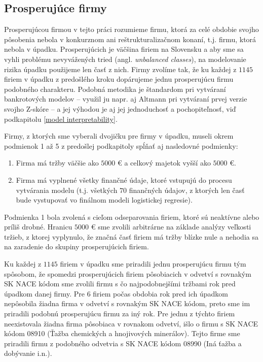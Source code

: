 \subsection{Prosperujúce firmy}

Prosperujúcou firmou v tejto práci rozumieme firmu, ktorá za celé obdobie svojho pôsobenia nebola v konkurznom ani reštrukturalizačnom konaní, t.j. firmu, ktorá nebola v úpadku.
Prosperujúcich je väčšina firiem na Slovensku a aby sme sa vyhli problému nevyvážených tried (angl. \emph{unbalanced classes}),
na modelovanie rizika úpadku použijeme len časť z nich.
Firmy zvolíme tak, že ku každej z \(1145\) firiem v úpadku z predošlého kroku dopárujeme jednu prosperujúcu firmu podobného charakteru.
Podobná metodika je štandardom pri vytváraní bankrotových modelov – využil ju napr. aj Altmann pri vytváraní prvej verzie svojho Z-skóre – a jej výhodou je aj jej jednoduchosť a pochopiteľnosť, viď podkapitolu \ref{model interpretability}.

Firmy, z ktorých sme vyberali dvojičku pre firmy v úpadku, museli okrem podmienok 1 až 5 z predošlej podkapitoly spĺňať aj nasledovné podmienky:

\begin{enumerate}
    \item Firma má tržby väčšie ako \(5000\) € a celkový majetok vyšší ako \(5000\) €.
    \item Firma má vyplnené všetky finančné údaje, ktoré vstupujú do procesu vytvárania modelu (t.j. všetkých \(70\) finančných údajov, z ktorých len časť bude vystupovať vo finálnom modeli logistickej regresie).
\end{enumerate}

Podmienka 1 bola zvolená s cieľom odseparovania firiem, ktoré sú neaktívne alebo príliš drobné.
Hranicu \(5000\) € sme zvolili arbitrárne na základe analýzy veľkosti tržieb, z ktorej vyplynulo, že značná časť firiem má tržby blízke nule a nehodia sa na zaradenie do skupiny prosperujúcich firiem.

Ku každej z \(1145\) firiem v úpadku sme priradili jednu prosperujúcu firmu tým spôsobom,
že spomedzi prosperujúcich firiem pôsobiacich v odvetví s rovnakým SK NACE kódom sme zvolili firmu s čo najpodobnejšími tržbami rok pred úpadkom danej firmy.
Pre \(6\) firiem počas obdobia rok pred ich úpadkom nepôsobila žiadna firma v odvetví s rovnakým SK NACE kódom, preto sme im priradili podobnú prosperujúcu firmu za iný rok.
Pre jednu z týchto firiem neexistovala žiadna firma pôsobiaca v rovnakom odvetví, išlo o firmu s SK NACE kódom 08910 (Ťažba chemických a hnojivových minerálov).
Tejto firme sme priradili firmu z podobného odvetvia s SK NACE kódom 08990 (Iná ťažba a dobývanie i.n.).

